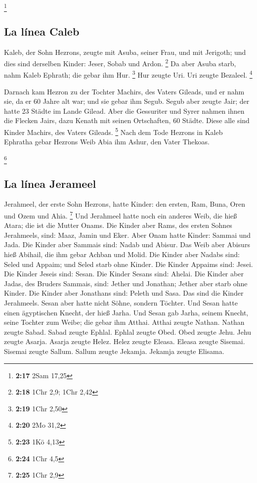 \footnote{\textbf{2:17} 2Sam 17,25}

\hypertarget{la-luxednea-caleb}{%
\subsection{La línea Caleb}\label{la-luxednea-caleb}}

 Kaleb, der Sohn Hezrons, zeugte mit Asuba, seiner Frau,
und mit Jerigoth; und dies sind derselben Kinder: Jeser, Sobab und
Ardon. \footnote{\textbf{2:18} 1Chr 2,9; 1Chr 2,42}  Da
aber Asuba starb, nahm Kaleb Ephrath; die gebar ihm Hur. \footnote{\textbf{2:19}
  1Chr 2,50}  Hur zeugte Uri. Uri zeugte Bezaleel.
\footnote{\textbf{2:20} 2Mo 31,2}

 Darnach kam Hezron zu der Tochter Machirs, des Vaters
Gileads, und er nahm sie, da er 60 Jahre alt war; und sie gebar ihm
Segub.  Segub aber zeugte Jair; der hatte 23 Städte im
Lande Gilead.  Aber die Gessuriter und Syrer nahmen ihnen
die Flecken Jairs, dazu Kenath mit seinen Ortschaften, 60 Städte. Diese
alle sind Kinder Machirs, des Vaters Gileads. \footnote{\textbf{2:23}
  1Kö 4,13}  Nach dem Tode Hezrons in Kaleb Ephratha
gebar Hezrons Weib Abia ihm Ashur, den Vater Thekoas.

\footnote{\textbf{2:24} 1Chr 4,5}

\hypertarget{la-luxednea-jerameel}{%
\subsection{La línea Jerameel}\label{la-luxednea-jerameel}}

 Jerahmeel, der erste Sohn Hezrons, hatte Kinder: den
ersten, Ram, Buna, Oren und Ozem und Ahia. \footnote{\textbf{2:25} 1Chr
  2,9}  Und Jerahmeel hatte noch ein anderes Weib, die
hieß Atara; die ist die Mutter Onams.  Die Kinder aber
Rams, des ersten Sohnes Jerahmeels, sind: Maaz, Jamin und Eker.
 Aber Onam hatte Kinder: Sammai und Jada. Die Kinder aber
Sammais sind: Nadab und Abisur.  Das Weib aber Abisurs
hieß Abihail, die ihm gebar Achban und Molid.  Die Kinder
aber Nadabs sind: Seled und Appaim; und Seled starb ohne Kinder.
 Die Kinder Appaims sind: Jesei. Die Kinder Jeseis sind:
Sesan. Die Kinder Sesans sind: Ahelai.  Die Kinder aber
Jadas, des Bruders Sammais, sind: Jether und Jonathan; Jether aber starb
ohne Kinder.  Die Kinder aber Jonathans sind: Peleth und
Sasa. Das sind die Kinder Jerahmeels.  Sesan aber hatte
nicht Söhne, sondern Töchter. Und Sesan hatte einen ägyptischen Knecht,
der hieß Jarha.  Und Sesan gab Jarha, seinem Knecht,
seine Tochter zum Weibe; die gebar ihm Atthai.  Atthai
zeugte Nathan. Nathan zeugte Sabad.  Sabad zeugte Ephlal.
Ephlal zeugte Obed.  Obed zeugte Jehu. Jehu zeugte
Asarja.  Asarja zeugte Helez. Helez zeugte Eleasa.
 Eleasa zeugte Sisemai. Sisemai zeugte Sallum.
 Sallum zeugte Jekamja. Jekamja zeugte Elisama.

